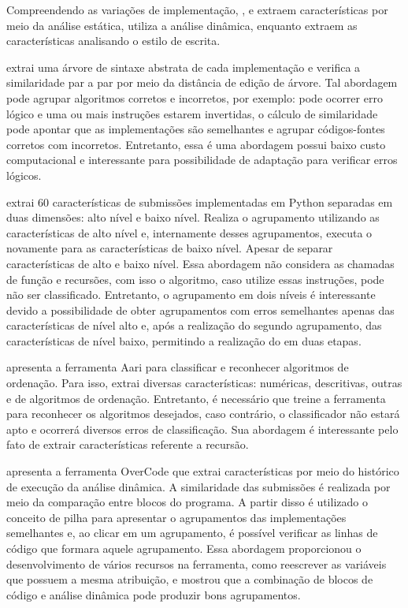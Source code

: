 	Compreendendo as variações de implementação, ,
	 e  extraem características
	por meio da análise estática,  utiliza a análise dinâmica,
	enquanto  extraem as características analisando o estilo de escrita.
	
	 extrai uma árvore de sintaxe abstrata de cada implementação
	e verifica a similaridade par a par por meio da distância de edição de árvore. Tal
	abordagem pode agrupar algoritmos corretos e incorretos, por exemplo: pode ocorrer
	erro lógico e uma ou mais instruções estarem invertidas, o cálculo de similaridade
	pode apontar que as implementações são semelhantes e agrupar códigos-fontes corretos
	com incorretos. Entretanto, essa é uma abordagem possui baixo custo computacional e
	interessante para possibilidade de adaptação para verificar erros lógicos.
	
	 extrai 60 características de submissões implementadas
	em Python separadas em duas dimensões: alto nível e baixo nível. Realiza o agrupamento
	utilizando as características de alto nível e, internamente desses agrupamentos,
	executa o  novamente para as características de baixo nível. Apesar
	de separar características de alto e baixo nível. Essa abordagem não considera as
	chamadas de função e recursões, com isso o algoritmo, caso utilize essas instruções,
	pode não ser classificado. Entretanto, o agrupamento em dois níveis é interessante
	devido a possibilidade de obter agrupamentos com erros semelhantes apenas das
	características de nível alto e, após a realização do segundo agrupamento, das
	características de nível baixo, permitindo a realização do  em
	duas etapas.
	
	 apresenta a ferramenta Aari para classificar e reconhecer
	algoritmos de ordenação. Para isso, extrai diversas características: numéricas,
	descritivas, outras e de algoritmos de ordenação. Entretanto, é necessário que
	treine a ferramenta para reconhecer os algoritmos desejados, caso contrário, o
	classificador não estará apto e ocorrerá diversos erros de classificação. Sua
	abordagem é interessante pelo fato de extrair características referente a recursão.
	
	 apresenta a ferramenta OverCode que extrai características
	por meio do histórico de execução da análise dinâmica. A similaridade das submissões
	é realizada por meio da comparação entre blocos do programa. A partir disso é utilizado
	o conceito de pilha para apresentar o agrupamentos das implementações semelhantes e,
	ao clicar em um agrupamento, é possível verificar as linhas de código que formara
	aquele agrupamento. Essa abordagem proporcionou o desenvolvimento de vários recursos
	na ferramenta, como reescrever as variáveis que possuem a mesma atribuição, e mostrou
	que a combinação de blocos de código e análise dinâmica pode produzir bons agrupamentos.
	
